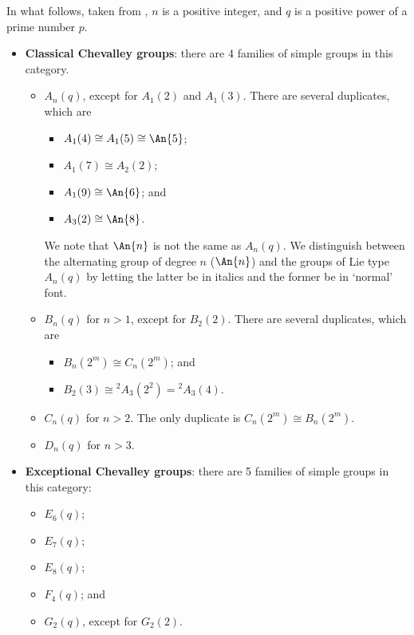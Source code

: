 In what follows, taken from \cite{wikipedia_listofsimplegroups}, $n$ is a positive integer, and $q$ is a positive power of a prime number $p$.
\begin{itemize}
    \item \textbf{Classical Chevalley groups}: there are 4 families of simple groups in this category.
    \begin{itemize}
        \item $A_n(q)$, except for $A_1(2)$ and $A_1(3)$. There are several duplicates, which are
        \begin{itemize}
            \item $A_1(4) \cong A_1(5) \cong \An{5}$;
            \item $A_1(7) \cong A_2(2)$;
            \item $A_1(9) \cong \An{6}$; and
            \item $A_3(2) \cong \An{8}$.
        \end{itemize}
        We note that $\An{n}$ is not the same as $A_n(q)$. We distinguish between the alternating group of degree $n$ ($\An{n}$) and the groups of Lie type $A_n(q)$ by letting the latter be in italics and the former be in `normal' font.

        \item $B_n(q)$ for $n > 1$, except for $B_2(2)$. There are several duplicates, which are
        \begin{itemize}
            \item $B_n(2^m) \cong C_n(2^m)$; and
            \item $B_2(3) \cong {^2A_3(2^2)} = {^2A_3(4)}$.
        \end{itemize}
        \item $C_n(q)$ for $n > 2$. The only duplicate is $C_n(2^m) \cong B_n(2^m)$.
        \item $D_n(q)$ for $n > 3$.
    \end{itemize}
    
    \item \textbf{Exceptional Chevalley groups}: there are 5 families of simple groups in this category:
    \begin{itemize}
        \item $E_6(q)$;
        \item $E_7(q)$;
        \item $E_8(q)$;
        \item $F_4(q)$; and
        \item $G_2(q)$, except for $G_2(2)$.
    \end{itemize}
    

\end{itemize}
